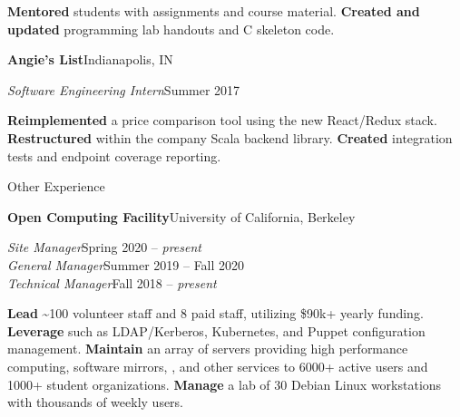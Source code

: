 \begin{minipage}[t]{0.665\textwidth}
\begin{adjustwidth}{10pt}{}
    \textbf{Mentored} students with assignments and course material.
    \textbf{Created and updated} programming lab handouts and C skeleton code.
  \end{adjustwidth}

  \vspace{5pt}
  \textbf{Angie's List}\quad{}\hfill Indianapolis, IN
  \begin{adjustwidth}{10pt}{}
    \emph{Software Engineering Intern}\hfill Summer 2017

    \textbf{Reimplemented} a price comparison tool using the new React/Redux stack.
    \textbf{Restructured}  within the company Scala backend library.
    \textbf{Created} integration tests and endpoint coverage reporting.
  \end{adjustwidth}





  \vspace{10pt}

  {\sectionfont Other Experience}

  \vspace{5pt}
  \textbf{Open Computing Facility}\quad{}\hfill University of California, Berkeley
  \begin{adjustwidth}{10pt}{}
    \emph{Site Manager}\hfill Spring 2020 -- \emph{present}\\
    \emph{General Manager}\hfill Summer 2019 -- Fall 2020\\
    \emph{Technical Manager}\hfill Fall 2018 -- \emph{present}

    \textbf{Lead} \textasciitilde{}100 volunteer staff and 8 paid staff, utilizing \$90k+ yearly funding.
    \textbf{Leverage}  such as LDAP/Kerberos, Kubernetes, and Puppet configuration management.
    \textbf{Maintain} an array of servers providing high performance computing, software mirrors, , and other services to 6000+ active users and 1000+ student organizations.
    \textbf{Manage} a lab of 30 Debian Linux workstations with thousands of weekly users.


\end{adjustwidth}
\end{minipage}
